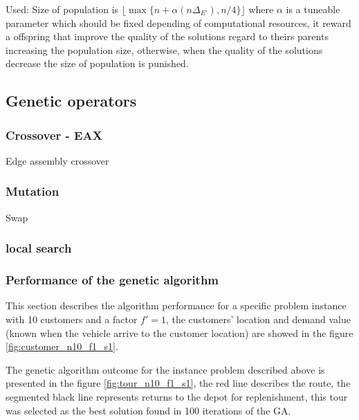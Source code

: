 Used:
Size of population is $\lfloor \max \{ n+\alpha(n\Delta_{E'}), n/4 \} \rfloor$ where $\alpha$ is a tuneable parameter which should be fixed depending of computational resources, it reward a offspring that improve the quality of the solutions regard to theirs parents increasing the population size, otherwise, when the quality of the solutions decrease the size of population is punished.


\subsection{Genetic operators}

\subsubsection{Crossover - EAX}

Edge assembly crossover

\subsubsection*{Mutation}

Swap

\subsubsection*{local search}

\subsubsection*{Performance of the genetic algorithm}

This section describes the algorithm performance for a specific problem instance with 10 customers and a factor $f'=1$, the customers' location and demand value (known when the vehicle arrive to the customer location) are showed in the figure \ref{fig:customer_n10_f1_s1}.



The genetic algorithm outcome for the instance problem described above is presented in the figure \ref{fig:tour_n10_f1_s1}, the red line describes the route, the segmented black line represents returns to the depot for replenishment, this tour was selected as the best solution found in 100 iterations of the GA.

